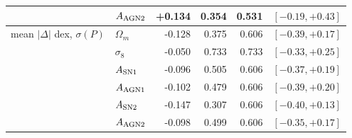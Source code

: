 \begin{table}[htbp]
\begin{tabular}{llrrrc}
         & $A_{\rm AGN2}$ & +0.134 & 0.354 & 0.531 & $[-0.19, +0.43]$ \\
        \midrule
        mean $|\Delta|$ dex, $\sigma(P)$ & $\Omega_m$ & -0.128 & 0.375 & 0.606 & $[-0.39, +0.17]$ \\
         & $\sigma_8$ & -0.050 & 0.733 & 0.733 & $[-0.33, +0.25]$ \\
         & $A_{\rm SN1}$ & -0.096 & 0.505 & 0.606 & $[-0.37, +0.19]$ \\
         & $A_{\rm AGN1}$ & -0.102 & 0.479 & 0.606 & $[-0.39, +0.20]$ \\
         & $A_{\rm SN2}$ & -0.147 & 0.307 & 0.606 & $[-0.40, +0.13]$ \\
         & $A_{\rm AGN2}$ & -0.098 & 0.499 & 0.606 & $[-0.35, +0.17]$ \\
        \bottomrule
    \end{tabular}
\end{table}
